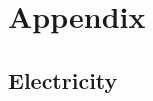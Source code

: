\section*{Appendix}

\appendix
\subsection*{Electricity}
\label{appendix:electricity:pca:1}
\label{appendix:electricity:pca:2}